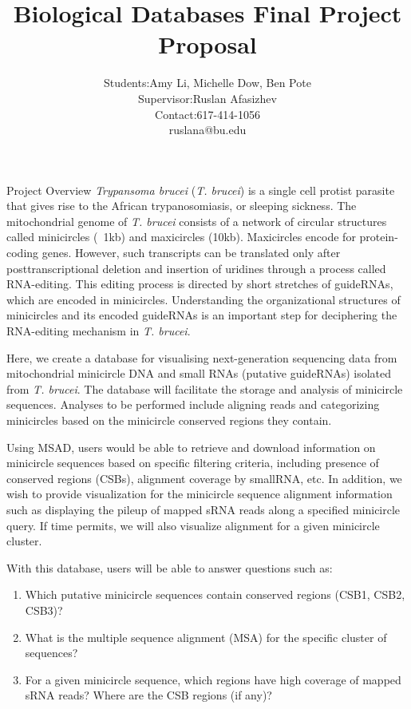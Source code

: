 \documentclass[a4paper,10pt,notitlepage]{article}
\title{Biological Databases Final Project Proposal}
\author{
    \begin{tabular}{l l}
    Students: & Amy Li, Michelle Dow, Ben Pote \\
    Supervisor: & Ruslan Afasizhev \\
    Contact: & 617-414-1056 \\
    & ruslana@bu.edu
\end{tabular}
}
\begin{document}
\lstset{language=sql}

\maketitle

\begin{section}{Project Overview}
    \emph{Trypansoma brucei} (\emph{T. brucei}) is a single cell protist parasite that gives rise to the African trypanosomiasis, 
or sleeping sickness. The mitochondrial genome of \emph{T. brucei} consists of a network of circular structures called 
minicircles (~1kb) and maxicircles (10kb). Maxicircles encode for protein-coding genes. However, such transcripts
can be translated only after posttranscriptional deletion and insertion of uridines through a process called 
RNA-editing. This editing process is directed by short stretches of guideRNAs, which are encoded in minicircles.
Understanding the organizational structures of minicircles and its encoded guideRNAs is an important step for 
deciphering the RNA-editing mechanism in \emph{T. brucei}. 

Here, we create a database for visualising next-generation sequencing data from mitochondrial minicircle DNA and
small RNAs (putative guideRNAs) isolated from \emph{T. brucei}. The database will facilitate the storage and analysis of 
minicircle sequences. Analyses to be performed include aligning reads and categorizing minicircles based on the 
minicircle conserved regions they contain. 

Using MSAD, users would be able to retrieve and download information on minicircle sequences based on specific 
filtering criteria, including presence of conserved regions (CSBs), alignment coverage by smallRNA, etc. In 
addition, we wish to provide visualization for the minicircle sequence alignment information such as displaying 
the pileup of mapped sRNA reads along a specified minicircle query. If time permits, we will also visualize 
alignment for a given minicircle cluster.
 
With this database, users will be able to answer questions such as:

\begin{enumerate}
    \item Which putative minicircle sequences contain conserved regions (CSB1, CSB2, CSB3)?
    \item What is the multiple sequence alignment (MSA) for the specific cluster of sequences?
    \item For a given minicircle sequence, which regions have high coverage of mapped sRNA reads? Where are the CSB regions (if any)?
\end{enumerate}



\end{section}
\end{document}
